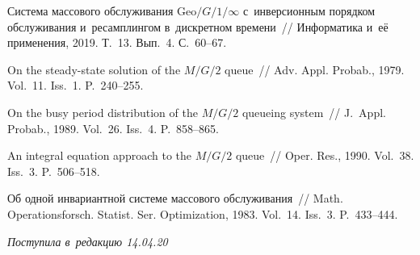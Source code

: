 \begin{multicols}{2}
{{\begin{thebibliography}{9}
 Система массового обслуживания 
Geo$/G/1/\infty$ с~инверсионным порядком обслуживания и~ресамплингом 
в~дискретном времени~// Информатика и~её применения, 2019. Т.~13. Вып.~4. 
С.~60--67.

 On the steady-state solution of the $M/G/2$ 
queue~// Adv. Appl. Probab., 1979. Vol.~11. Iss.~1. P.~240--255.

On the busy period distribution of the $M/G/2$ queueing system~//
J.~Appl. Probab., 1989. Vol.~26. Iss.~4. P.~858--865.

 An integral equation 
approach
to the $M/G/2$ queue~// Oper. Res., 1990. Vol.~38. Iss.~3. P.~506--518.

 Об одной инвариантной системе массового 
обслуживания~// Math.
Operationsforsch. Statist. Ser. Optimization, 1983. Vol.~14. Iss.~3. 
P.~433--444.

\end{thebibliography}

 }
 }

\end{multicols}

\vspace*{-3pt}

\hfill{\small\textit{Поступила в~редакцию 14.04.20}}



\newpage

\vspace*{-28pt}





\def\tit{STATIONARY CHARACTERISTICS OF $M/G/2/\infty$ QUEUE 
WITH~IDENTICAL SERVERS, LIFO SERVICE, AND~RESAMPLING~POLICY\\[-7pt]}


\def\titkol{Stationary characteristics of $M/G/2/\infty$ queue with 
identical servers, LIFO service, and 
resampling policy}

\def\aut{L.\,A.\ Meykhanadzhyan$^1$ and 
R.\,V.~Razumchik$^2$\\[-7pt]}

